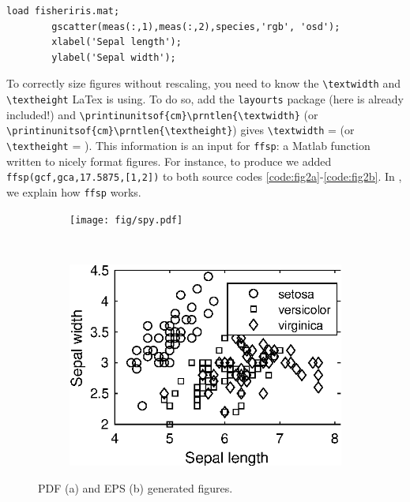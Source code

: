 	\begin{lstlisting}[style=Matlab-editor, caption={Matlab code for \reffig{fig:classification}}, label=code:fig2b]
		load fisheriris.mat; 
		gscatter(meas(:,1),meas(:,2),species,'rgb', 'osd');
		xlabel('Sepal length');
		ylabel('Sepal width');
	\end{lstlisting}
	
	To correctly size figures without rescaling, you need to know the \verb*|\textwidth| and  \verb*|\textheight| LaTex is using. 
	To do so, add the \verb*|layourts| package (here is already included!) and \verb*|\printinunitsof{cm}\prntlen{\textwidth}| (or \verb*|\printinunitsof{cm}\prntlen{\textheight}|) gives \verb*|\textwidth| = \prntlen{\textwidth} (or \verb*|\textheight| = \prntlen{\textheight}).
	This information is an input for \verb*|ffsp|: a Matlab function written to nicely format figures. 
	For instance, to produce  we added \verb*|ffsp(gcf,gca,17.5875,[1,2])| to both source codes \ref{code:fig2a}-\ref{code:fig2b}.
	In , we explain how \verb*|ffsp| works.
	
	\begin{figure}[H]
		\centering
		\begin{subfigure}{\subfigsz\textwidth}
			\texttt{[image: fig/spy.pdf]}
		\end{subfigure}
		\
		\begin{subfigure}{\subfigsz\textwidth}
			\includegraphics{fig/gscatter.eps}
		\end{subfigure}
		\caption{PDF (a) and EPS (b) generated figures. \label{fig:math-stuff}}
	\end{figure}